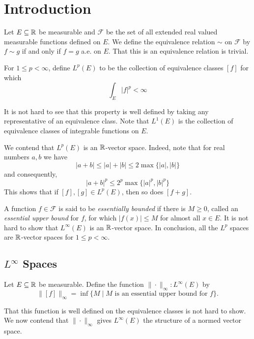 \section{Introduction}

Let $E\subseteq\mathbb{R}$ be measurable and $\mathcal F$ be the set of all extended real valued measurable functions defined on $E$. We define the equivalence relation $\sim$ on $\mathcal F$ by $f\sim g$ if and only if $f = g$ a.e. on $E$. That this is an equivalence relation is trivial.

For $1\le p < \infty$, define $L^p(E)$ to be the collection of equivalence classes $[f]$ for which 
\begin{equation*}
    \int_E|f|^p < \infty
\end{equation*}

It is not hard to see that this property is well defined by taking any representative of an equivalence class. Note that $L^1(E)$ is the collection of equivalence classes of integrable functions on $E$.

We contend that $L^p(E)$ is an $\mathbb{R}$-vector space. Indeed, note that for real numbers $a,b$ we have 
\begin{equation*}
    |a + b|\le |a| + |b|\le 2\max\{|a|,|b|\}
\end{equation*}
and consequently, 
\begin{equation*}
    |a + b|^p\le 2^p\max\{|a|^p,|b|^p\}
\end{equation*}
This shows that if $[f],[g]\in L^p(E)$, then so does $[f + g]$.

A function $f\in\mathcal F$ is said to be \textit{essentially bounded} if there is $M\ge 0$, called an \textit{essential upper bound} for $f$, for which $|f(x)|\le M$ for almost all $x\in E$. It is not hard to show that $L^\infty(E)$ is an $\mathbb{R}$-vector space. In conclusion, all the $L^p$ spaces are $\mathbb{R}$-vector spaces for $1\le p < \infty$.

\subsection{\texorpdfstring{$L^\infty$ Spaces}{}}

Let $E\subseteq\mathbb{R}$ be measurable. Define the function $\|\cdot\|_{\infty}: L^\infty(E)$ by 
\begin{equation*}
    \|[f]\|_\infty = \inf\{M\mid\text{$M$ is an essential upper bound for $f$}\}.
\end{equation*}

That this function is well defined on the equivalence classes is not hard to show. We now contend that $\|\cdot\|_\infty$ gives $L^\infty(E)$ the structure of a normed vector space. 

